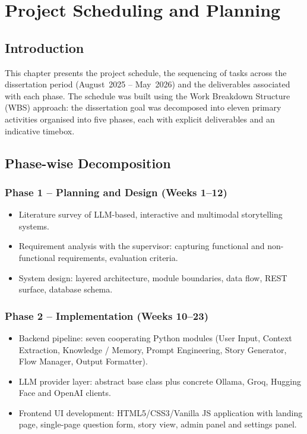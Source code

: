 \chapter{Project Scheduling and Planning}
\label{ch:schedule}

\section{Introduction}
This chapter presents the project schedule, the sequencing of tasks
across the dissertation period (August~2025 -- May~2026) and the
deliverables associated with each phase. The schedule was built using
the Work Breakdown Structure (WBS) approach: the dissertation goal was
decomposed into eleven primary activities organised into five phases,
each with explicit deliverables and an indicative timebox.

\section{Phase-wise Decomposition}

\subsection{Phase 1 -- Planning and Design (Weeks 1--12)}
\begin{itemize}
    \item Literature survey of LLM-based, interactive and multimodal
    storytelling systems.
    \item Requirement analysis with the supervisor: capturing
    functional and non-functional requirements, evaluation criteria.
    \item System design: layered architecture, module boundaries,
    data flow, REST surface, database schema.
\end{itemize}

\subsection{Phase 2 -- Implementation (Weeks 10--23)}
\begin{itemize}
    \item Backend pipeline: seven cooperating Python modules (User
    Input, Context Extraction, Knowledge / Memory, Prompt Engineering,
    Story Generator, Flow Manager, Output Formatter).
    \item LLM provider layer: abstract base class plus concrete
    Ollama, Groq, Hugging Face and OpenAI clients.
    \item Frontend UI development: HTML5/CSS3/Vanilla JS application
    with landing page, single-page question form, story view, admin
    panel and settings panel.
\end{itemize}


